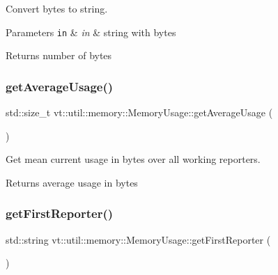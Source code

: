 Convert bytes to string. 


\begin{DoxyParams}[1]{Parameters}
\mbox{\tt in}  & {\em in} & string with bytes\\
\hline
\end{DoxyParams}
\begin{DoxyReturn}{Returns}
number of bytes 
\end{DoxyReturn}
\mbox{\label{structvt_1_1util_1_1memory_1_1_memory_usage_a59d87ec931fe37d4300ba72b00e63d8e}} 
\subsubsection{\texorpdfstring{get\+Average\+Usage()}{getAverageUsage()}}
{\footnotesize\ttfamily std\+::size\+\_\+t vt\+::util\+::memory\+::\+Memory\+Usage\+::get\+Average\+Usage (\begin{DoxyParamCaption}{ }\end{DoxyParamCaption})}



Get mean current usage in bytes over all working reporters. 

\begin{DoxyReturn}{Returns}
average usage in bytes 
\end{DoxyReturn}
\mbox{\label{structvt_1_1util_1_1memory_1_1_memory_usage_a5baf0fd6bf753755c4602fcb91a7c268}} 
\subsubsection{\texorpdfstring{get\+First\+Reporter()}{getFirstReporter()}}
{\footnotesize\ttfamily std\+::string vt\+::util\+::memory\+::\+Memory\+Usage\+::get\+First\+Reporter (\begin{DoxyParamCaption}{ }\end{DoxyParamCaption})}




